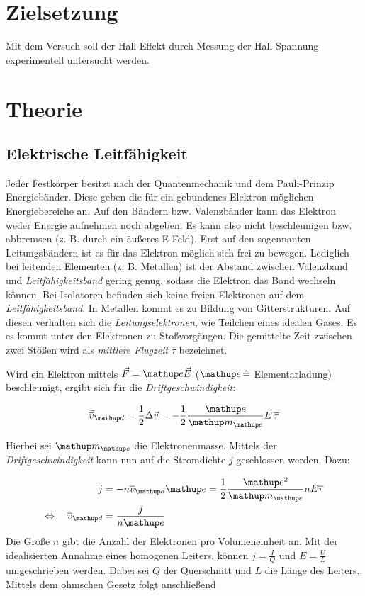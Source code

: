 \setcounter{page}{1}
\section*{Zielsetzung}
Mit dem Versuch soll der Hall-Effekt durch Messung der
Hall-Spannung experimentell untersucht werden. %

\section{Theorie}

\subsection{Elektrische Leitfähigkeit}
Jeder Festkörper besitzt nach der Quantenmechanik und dem Pauli-Prinzip
Energiebänder.
Diese geben die für ein gebundenes Elektron möglichen Energiebereiche an. Auf den Bändern bzw. Valenzbänder kann das Elektron weder
Energie aufnehmen noch abgeben.
Es kann also nicht beschleunigen bzw. abbremsen (z. B. durch ein äußeres E-Feld).
Erst auf den sogennanten Leitungsbändern ist es für das Elektron möglich
sich frei zu bewegen.
Lediglich bei leitenden Elementen (z. B. Metallen) ist der Abstand zwischen Valenzband und \emph{Leitfähigkeitsband} gering genug, sodass die Elektron das Band
wechseln können.
Bei Isolatoren befinden sich keine freien Elektronen auf dem \emph{Leitfähigkeitsband}.
In Metallen kommt es zu Bildung von Gitterstrukturen.
Auf diesen verhalten sich die \emph{Leitungselektronen}, wie Teilchen eines idealen Gases.
Es es kommt unter den Elektronen zu Stoßvorgängen.
Die gemittelte Zeit zwischen zwei Stößen wird als \emph{mittlere Flugzeit} $\overline{\tau}$ bezeichnet.

Wird ein Elektron mittels $\vec{F}=\map{e}\vec{E}$ ($\map{e}\, \hat{=}$ Elementarladung) beschleunigt, %
ergibt sich für die \emph{Driftgeschwindigkeit}: %

\begin{equation}
\label{eq:drift_v}
\vec{\overline{v}}\ua{d}=\frac{1}{2}\Delta\vec{v}=-\frac{1}{2}\frac{\map{e}}{\map{m}\ua{e}}\vec{E}\,\overline{\tau}
\end{equation}

Hierbei sei $\map{m}\ua{e}$ die Elektronenmasse.
Mittels der \emph{Driftgeschwindigkeit} kann nun auf die Stromdichte $j$ geschlossen werden. Dazu:

\begin{align}
j&=-n\overline{v}\ua{d}\map{e}=\frac{1}{2}\frac{\map{e^2}}{\map{m}\ua{e}}n E\overline{\tau}\notag \\
\Leftrightarrow \quad \overline{v}\ua{d}&=\frac{j}{n\map{e}}\label{eq:stromdicht}
\end{align}
Die Größe $n$ gibt die Anzahl der Elektronen pro Volumeneinheit an.
Mit der idealisierten Annahme eines homogenen Leiters, können %
$j=\frac{I}{Q}$ und $E=\frac{U}{L}$ umgeschrieben werden.
Dabei sei $Q$ der Querschnitt und $L$ die Länge des Leiters.
Mittels dem ohmschen Gesetz folgt anschließend


